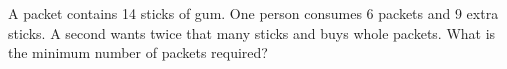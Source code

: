 A packet contains 14 sticks of gum. One person consumes 6 packets and 9 extra sticks. A second wants twice that many sticks and buys whole packets. What is the minimum number of packets required?
